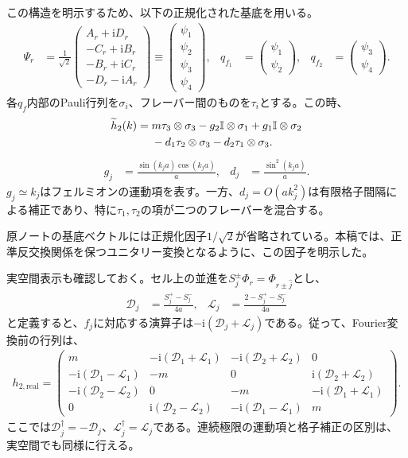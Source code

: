 \documentclass[a4paper,10.5pt]{article}
\numberwithin{equation}{section}
\providecommand{\ii}{\mathrm{i}}
\providecommand{\id}{\mathbb{I}}
\begin{document}
この構造を明示するため、以下の正規化された基底を用いる。
\begin{align}
\Psi_r&=\frac1{\sqrt2}
\begin{pmatrix}
A_r+\ii D_r\\
-C_r+\ii B_r\\
-B_r+\ii C_r\\
-D_r-\ii A_r
\end{pmatrix}
\equiv\begin{pmatrix}\psi_1\\\psi_2\\\psi_3\\\psi_4\end{pmatrix},&
q_{f_1}&=\begin{pmatrix}\psi_1\\\psi_2\end{pmatrix},&
q_{f_2}&=\begin{pmatrix}\psi_3\\\psi_4\end{pmatrix}.
\end{align}
各$q_f$内部のPauli行列を$\sigma_i$、フレーバー間のものを$\tau_i$とする。この時、
\begin{align}
\widetilde h_2(k)
={}&m\tau_3\otimes\sigma_3
-g_2\id\otimes\sigma_1+g_1\id\otimes\sigma_2\notag\\
&-d_1\tau_2\otimes\sigma_3-d_2\tau_1\otimes\sigma_3.\label{eq:flavor}
\end{align}
\begin{align}
g_j&=\frac{\sin(k_ja)\cos(k_ja)}a,&
d_j&=\frac{\sin^2(k_ja)}a.
\end{align}
$g_j\simeq k_j$はフェルミオンの運動項を表す。一方、$d_j=O(ak_j^2)$は有限格子間隔による補正であり、特に$\tau_1,\tau_2$の項が二つのフレーバーを混合する。
\begin{remarkbox}
原ノートの基底ベクトルには正規化因子$1/\sqrt2$が省略されている。本稿では、正準反交換関係を保つユニタリー変換となるように、この因子を明示した。
\end{remarkbox}
実空間表示も確認しておく。セル上の並進を$S_j^\pm\Phi_r=\Phi_{r\pm\hat j}$とし、
\begin{align}
\mathcal D_j&=\frac{S_j^+-S_j^-}{4a},&
\mathcal L_j&=\frac{2-S_j^+-S_j^-}{4a}
\end{align}
と定義すると、$f_j$に対応する演算子は$-\ii(\mathcal D_j+\mathcal L_j)$である。従って、Fourier変換前の行列は、
\begin{align}
h_{2,\mathrm{real}}=
\begin{pmatrix}
m&-\ii(\mathcal D_1+\mathcal L_1)&-\ii(\mathcal D_2+\mathcal L_2)&0\\
-\ii(\mathcal D_1-\mathcal L_1)&-m&0&\ii(\mathcal D_2+\mathcal L_2)\\
-\ii(\mathcal D_2-\mathcal L_2)&0&-m&-\ii(\mathcal D_1+\mathcal L_1)\\
0&\ii(\mathcal D_2-\mathcal L_2)&-\ii(\mathcal D_1-\mathcal L_1)&m
\end{pmatrix}.
\end{align}
ここでは$\mathcal D_j^\dagger=-\mathcal D_j$、$\mathcal L_j^\dagger=\mathcal L_j$である。連続極限の運動項と格子補正の区別は、実空間でも同様に行える。
\end{document}
